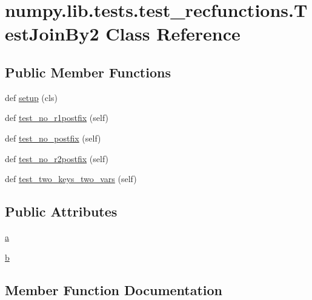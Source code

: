 \hypertarget{classnumpy_1_1lib_1_1tests_1_1test__recfunctions_1_1TestJoinBy2}{}\section{numpy.\+lib.\+tests.\+test\+\_\+recfunctions.\+Test\+Join\+By2 Class Reference}
\label{classnumpy_1_1lib_1_1tests_1_1test__recfunctions_1_1TestJoinBy2}
\subsection*{Public Member Functions}
\begin{DoxyCompactItemize}
\item 
def \hyperlink{classnumpy_1_1lib_1_1tests_1_1test__recfunctions_1_1TestJoinBy2_aed33f1246897bf4c2ef57a059867d2ab}{setup} (cls)
\item 
def \hyperlink{classnumpy_1_1lib_1_1tests_1_1test__recfunctions_1_1TestJoinBy2_a9af2bd7560c3d02d3936d0e3e4697c57}{test\+\_\+no\+\_\+r1postfix} (self)
\item 
def \hyperlink{classnumpy_1_1lib_1_1tests_1_1test__recfunctions_1_1TestJoinBy2_a6df4160c42abeee59193267fc4bb616c}{test\+\_\+no\+\_\+postfix} (self)
\item 
def \hyperlink{classnumpy_1_1lib_1_1tests_1_1test__recfunctions_1_1TestJoinBy2_a50f53a53d32a697f518d69b6e663d9f7}{test\+\_\+no\+\_\+r2postfix} (self)
\item 
def \hyperlink{classnumpy_1_1lib_1_1tests_1_1test__recfunctions_1_1TestJoinBy2_ae7cede07c3f74f93f181237a40c25424}{test\+\_\+two\+\_\+keys\+\_\+two\+\_\+vars} (self)
\end{DoxyCompactItemize}
\subsection*{Public Attributes}
\begin{DoxyCompactItemize}
\item 
\hyperlink{classnumpy_1_1lib_1_1tests_1_1test__recfunctions_1_1TestJoinBy2_a9f9172b0a7d6fe7bed3cc64a71f1bab9}{a}
\item 
\hyperlink{classnumpy_1_1lib_1_1tests_1_1test__recfunctions_1_1TestJoinBy2_a27902bbb9b83fef8507f3e8b0a3bd77a}{b}
\end{DoxyCompactItemize}


\subsection{Member Function Documentation}
\mbox{\label{classnumpy_1_1lib_1_1tests_1_1test__recfunctions_1_1TestJoinBy2_aed33f1246897bf4c2ef57a059867d2ab}} 
